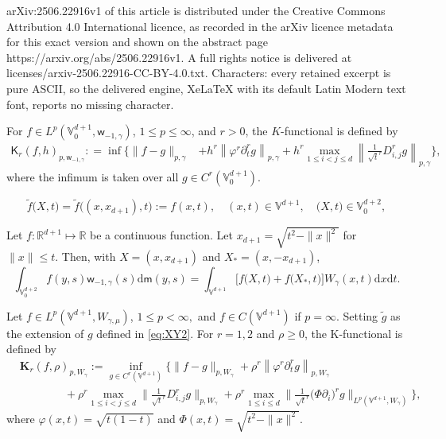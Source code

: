 \documentclass[10pt,a4paper]{amsart}
\def\Kb{{\mathbf K}}
\def\RR{{\mathbb R}}
\def\VV{{\mathbb V}}
\def\d{\mathrm{d}}
\def\f{\frac}
\def\g{{\gamma}}
\def\sK{{\mathsf K}}
\def\sm{{\mathsf m}}
\def\sw{{\mathsf w}}
\begin{document}
arXiv:2506.22916v1 of this article is distributed under the Creative Commons Attribution 4.0 International licence, as recorded in the arXiv licence metadata for this exact version and shown on the abstract page https://arxiv.org/abs/2506.22916v1. A full rights notice is delivered at licenses/arxiv-2506.22916-CC-BY-4.0.txt. Characters: every retained excerpt is pure ASCII, so the delivered engine, XeLaTeX with its default Latin Modern text font, reports no missing character.
\begin{defn}\label{eq:cs-K-func}
For $f\in L^p(\VV_0^{d+1}, \sw_{-1,\g})$, $1\leq p \le \infty$, and $r > 0$, the $K$-functional is defined by 
\begin{align*}
 \sK_r(f, h)_{p,\sw_{-1,\g}}: = \inf 
  	  \bigg \{ \|f-g\|_{p, \g}  & + h^r \left\|\varphi^r \partial^r_t g \right\|_{p, \g} 
	      + h^r  \max_{1\le i < j \le d} \left\| \f{1}{\sqrt{t}^r}D_{i,j}^r g\right\|_{p, \g} \bigg \},
\end{align*}
where the infimum is taken over all $g \in C^r(\VV_0^{d+1})$.
 \end{defn}  

\begin{equation}\label{eq:XY2}
	\tilde{f}\big(X, t\big)=\tilde{f}\big((x,x_{d+1}), t\big):=f(x,t), \quad  (x,t) \in \VV^{d+1}, \quad
	\big(X, t\big)\in\VV_0^{d+2},
\end{equation} 

\begin{lem}\label{prop:IntV0V}
Let $f: \RR^{d+1} \mapsto \RR$ be a continuous function. Let $x_{d+1} = \sqrt{t^2-\|x\|^2}$ for $\|x\| \le t$.
Then, with $X= (x,x_{d+1})$ and $X_* = (x,-x_{d+1})$, 
$$
	\int_{\VV_0^{d+2}} f(y,s) \sw_{-1,\g}(s) \d \sm(y,s) = \int_{\VV^{d+1}} 
	\big [ f\big(X,t\big) +  f\big(X_* ,t\big)\big ] W_{\g}(x,t) \d x\d t.
$$
\end{lem}

\begin{defn}\label{def:KfuncV} 
Let $f\in L^p(\VV^{d+1}, W_{\g,\mu})$, $1\leq p <  \infty,$ and $f\in C(\VV^{d+1})$
if $p=\infty$. Setting $\tilde{g}$ as the extension of $g$ defined in \eqref{eq:XY2}.
For   $r =1, 2$ and $\rho\geq 0$, the K-functional is defined by 
\begin{align*}
 & \Kb_r(f,\rho)_{p,W_{\g}} :=   \inf_{g \in C^r(\VV^{d+1})} 
	\bigg\{  \|f-g\|_{p,W_{\g}}  + \rho^r\left\|\varphi^{ r }\partial_t^rg  \right\|_{p,W_\g} \\ 
	& \qquad\qquad+ \rho^r \max_{1\leq i<j\leq d}   \Big \|\frac 1{\sqrt{t}^r}D_{i,j}^r g \Big \|_{p,W_{\g}}   
	+ \rho^r \max_{1\leq i \leq d} \Big \|\frac 1{\sqrt{t}^r} \big ( \Phi \partial_i \big)^r g \Big \|_{L^p(\VV^{d+1},W_\g)}  
\bigg\},
\end{align*}
where $\varphi(x,t) = \sqrt{t(1-t)}$ and $\Phi(x,t) = \sqrt{t^2 - \|x\|^2}$. 
\end{defn} 
\end{document}
